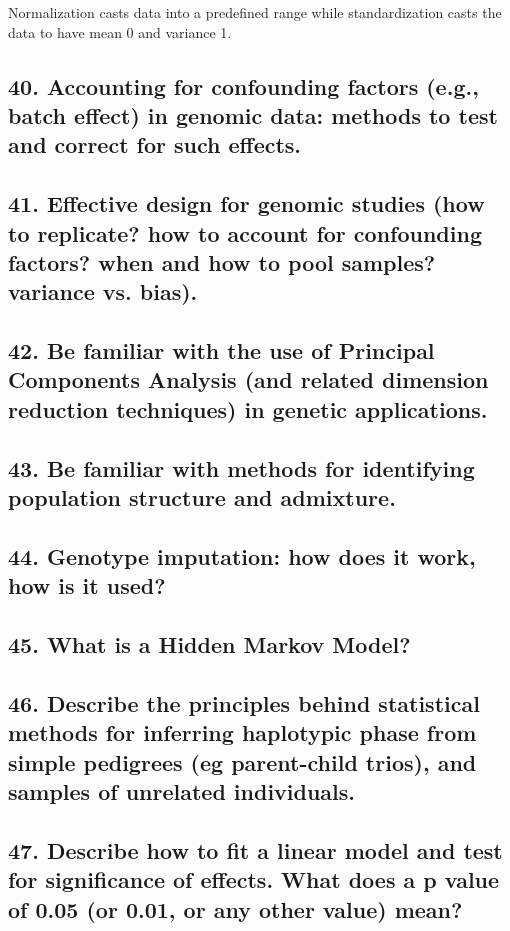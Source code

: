 \documentclass{tufte-handout}
\theoremstyle{noparens}
\begin{document}
Normalization casts data into a predefined range while standardization casts the data to have mean 0 and variance 1.

\newpage
\subsection{40. 
Accounting for confounding factors (e.g., batch effect) in genomic data: methods to test and correct for such effects.
}

\newpage
\subsection{41. 
Effective design for genomic studies (how to replicate? how to account for confounding factors? when and how to pool samples? variance vs. bias).
}

\newpage
\subsection{42. 
Be familiar with the use of Principal Components Analysis (and related dimension reduction techniques) in genetic applications.
}

\newpage
\subsection{43. 
Be familiar with methods for identifying population structure and admixture.
}

\newpage
\subsection{44. 
Genotype imputation: how does it work, how is it used?
}

\newpage
\subsection{45. 
What is a Hidden Markov Model?
}

\newpage
\subsection{46. 
Describe the principles behind statistical methods for inferring haplotypic phase from simple pedigrees (eg parent-child trios), and samples of unrelated individuals.
} 

\newpage
\subsection{47. Describe how to fit a linear model and test for significance of effects. What does a p value of 0.05 (or 0.01, or any other value) mean?
 } 
\end{document}
